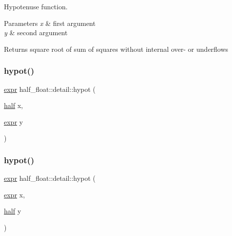 Hypotenuse function. 
\begin{DoxyParams}{Parameters}
{\em x} & first argument \\
\hline
{\em y} & second argument \\
\hline
\end{DoxyParams}
\begin{DoxyReturn}{Returns}
square root of sum of squares without internal over-\/ or underflows 
\end{DoxyReturn}
\mbox{\label{namespacehalf__float_1_1detail_a540836fd441b3d89f321b9db43c6e2ce}} 
\subsubsection{\texorpdfstring{hypot()}{hypot()}\hspace{0.1cm}{\footnotesize\ttfamily [2/4]}}
{\footnotesize\ttfamily \hyperlink{structhalf__float_1_1detail_1_1expr}{expr} half\+\_\+float\+::detail\+::hypot (\begin{DoxyParamCaption}\item[{\hyperlink{classhalf__float_1_1half}{half}}]{x,  }\item[{\hyperlink{structhalf__float_1_1detail_1_1expr}{expr}}]{y }\end{DoxyParamCaption})\hspace{0.3cm}{\ttfamily [inline]}}

\mbox{\label{namespacehalf__float_1_1detail_a10f0a3e50b1bc0a0c6760ce5f0a378bc}} 
\subsubsection{\texorpdfstring{hypot()}{hypot()}\hspace{0.1cm}{\footnotesize\ttfamily [3/4]}}
{\footnotesize\ttfamily \hyperlink{structhalf__float_1_1detail_1_1expr}{expr} half\+\_\+float\+::detail\+::hypot (\begin{DoxyParamCaption}\item[{\hyperlink{structhalf__float_1_1detail_1_1expr}{expr}}]{x,  }\item[{\hyperlink{classhalf__float_1_1half}{half}}]{y }\end{DoxyParamCaption})\hspace{0.3cm}{\ttfamily [inline]}}

